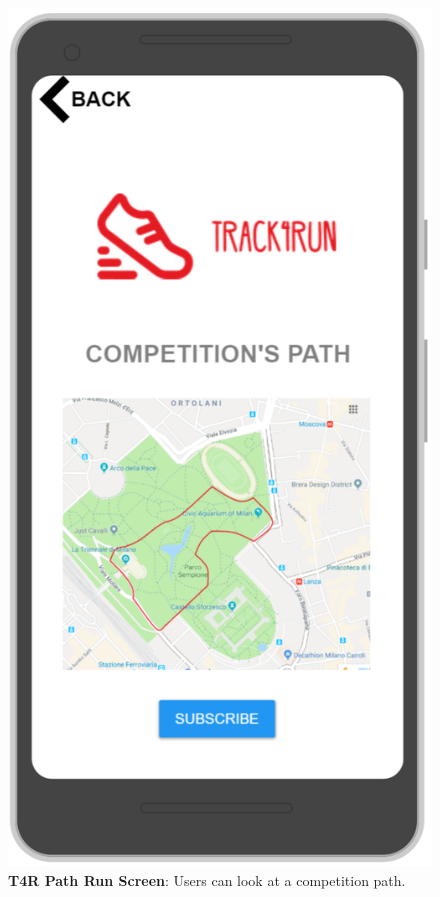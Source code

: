\begin{figure}[H]
\centering
\includegraphics[scale = 0.5]{Mocks/Mobile_T4R_Path.PNG}
\caption{\textbf{T4R Path Run Screen}: Users can look at a competition path.}
\end{figure}

